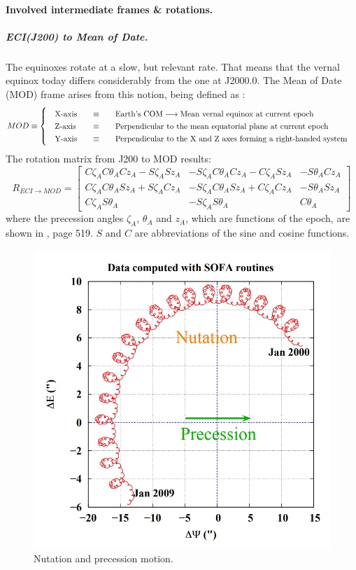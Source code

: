 		\paragraph{Involved intermediate frames \& rotations.}
		\subparagraph{ECI(J200) to Mean of Date. \\}
		\indent The equinoxes rotate at a slow, but relevant rate. That means that the vernal equinox today differs considerably from the one at J2000.0. The Mean of Date (MOD) frame arises from this notion, being defined as \cite{Tapley}: \\
		\[
		\arraycolsep=10pt
		\def\arraystretch{1.3}
		MOD\equiv\left\{
		\begin{array}{lll}
		\text{X-axis} 	& \equiv 	& \text{Earth's COM} \longrightarrow \text{Mean vernal equinox at current epoch} \\
		\text{Z-axis} 	& \equiv 	& \text{Perpendicular to the mean equatorial plane at current epoch} \\
		\text{Y-axis} 	& \equiv 	& \text{Perpendicular to the X and Z axes forming a right-handed system} \\
		\end{array}
		\right.
		\]
		\indent The rotation matrix from J200 to MOD results:
		\begin{equation}
		R_{ECI\rightarrow MOD} = 
		\left[ 
		\begin{array}{ccc}
		C \zeta_A C \theta_A C z_A - S \zeta_A S z_A 	& - S \zeta_A C \theta_A C z_A - C \zeta_A S z_A 	& -S \theta_A C z_A \\
		C \zeta_A C \theta_A S z_A + S \zeta_A C z_A 	& - S \zeta_A C \theta_A S z_A + C \zeta_A C z_A 	& -S \theta_A S z_A \\
 		C \zeta_A S \theta_A 							& - S \zeta_A S \theta_A 							& C \theta_A
		\end{array}
		\right]
		\label{eq: R_ECI_MOD}
		\end{equation}
		\noindent where the precession angles $\zeta_A$, $\theta_A$ and $z_A$, which are functions of the epoch, are shown in \cite{Tapley}, page 519. $S$ and $C$ are abbreviations of the sine and cosine functions.
		\begin{figure}[!htb]
		\centering\includegraphics[width = 0.4\linewidth]{Appendices/Appendix_B/Nut_prec}
		\caption{Nutation and precession motion.}
		\label{fig:	Nut_prec}
		\end{figure}
